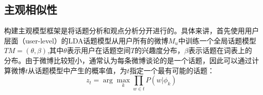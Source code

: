 
\subsection{主观相似性}
\label{similarity}


%

构建主观模型框架是将话题分析和观点分析分开进行的。具体来讲，首先使用用户层面（user-level）的LDA话题模型从用户所有的微博$M_u$中训练一个全局话题模型$ TM=(\theta,\beta) $,其中$ \theta $表示用户在话题空间$ T $的兴趣度分布，$ \beta $表示话题在词表上的分布。由于微博比较短小，通常认为每条微博谈论的是一个话题，因此可以通过计算微博$ t $从话题模型中产生的概率值，为$ t $指定一个最有可能的话题：
\begin{equation}
\label{eq6-1}
z_{t} = \arg \max_{k}\prod_{w \in t} P(w|\phi_{k})
\end{equation}

